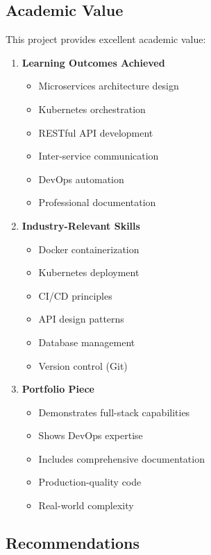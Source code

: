 \documentclass[12pt,a4paper]{article}
\begin{document}
\subsection{Academic Value}

This project provides excellent academic value:

\begin{enumerate}
    \item \textbf{Learning Outcomes Achieved}
    \begin{itemize}
        \item Microservices architecture design
        \item Kubernetes orchestration
        \item RESTful API development
        \item Inter-service communication
        \item DevOps automation
        \item Professional documentation
    \end{itemize}

    \item \textbf{Industry-Relevant Skills}
    \begin{itemize}
        \item Docker containerization
        \item Kubernetes deployment
        \item CI/CD principles
        \item API design patterns
        \item Database management
        \item Version control (Git)
    \end{itemize}

    \item \textbf{Portfolio Piece}
    \begin{itemize}
        \item Demonstrates full-stack capabilities
        \item Shows DevOps expertise
        \item Includes comprehensive documentation
        \item Production-quality code
        \item Real-world complexity
    \end{itemize}
\end{enumerate}

\subsection{Recommendations}
\end{document}
